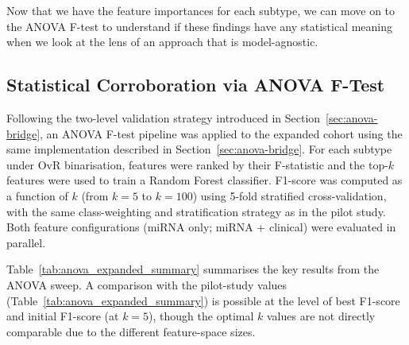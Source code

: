 Now that we have the feature importances for each subtype, we can move on to the ANOVA F-test
to understand if these findings have any statistical meaning when we look at the lens of an approach 
that is model-agnostic.

\FloatBarrier
\subsection{Statistical Corroboration via ANOVA F-Test}
\label{sec:expanded_anova}

Following the two-level validation strategy introduced in
Section~\ref{sec:anova-bridge}, an ANOVA F-test pipeline was applied to the expanded
cohort using the same implementation described in Section~\ref{sec:anova-bridge}.
For each subtype under OvR binarisation, features were ranked by their F-statistic
and the top-$k$ features were used to train a Random Forest classifier. F1-score was
computed as a function of $k$ (from $k = 5$ to $k = 100$) using 5-fold
stratified cross-validation, with the same class-weighting and stratification
strategy as in the pilot study. Both feature configurations (miRNA only; miRNA +
clinical) were evaluated in parallel.

Table~\ref{tab:anova_expanded_summary} summarises the key results from the ANOVA
sweep. A comparison with the pilot-study values (Table~\ref{tab:anova_expanded_summary}) is
possible at the level of best F1-score and initial F1-score (at $k = 5$),
though the optimal $k$ values are not directly comparable due to the different
feature-space sizes.


